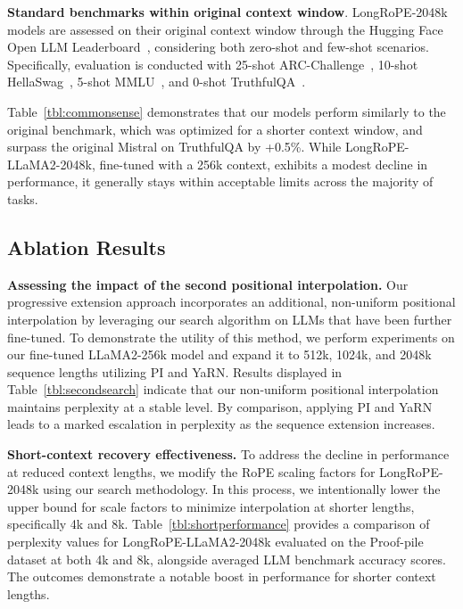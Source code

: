 \textbf{Standard benchmarks within original context window}. LongRoPE-2048k models are assessed on their original context window through the Hugging Face Open LLM Leaderboard~\cite{huggingfaceboard}, considering both zero-shot and few-shot scenarios. Specifically, evaluation is conducted with 25-shot ARC-Challenge~\cite{allenai:arc}, 10-shot HellaSwag~\cite{zellers2019hellaswag}, 5-shot MMLU~\cite{mmlu}, and 0-shot TruthfulQA~\cite{lin2021truthfulqa}.

Table~\ref{tbl:commonsense} demonstrates that our models perform similarly to the original benchmark, which was optimized for a shorter context window, and surpass the original Mistral on TruthfulQA by +0.5\%. While LongRoPE-LLaMA2-2048k, fine-tuned with a 256k context, exhibits a modest decline in performance, it generally stays within acceptable limits across the majority of tasks.

\subsection{Ablation Results}

\textbf{Assessing the impact of the second positional interpolation.} Our progressive extension approach incorporates an additional, non-uniform positional interpolation by leveraging our search algorithm on LLMs that have been further fine-tuned. To demonstrate the utility of this method, we perform experiments on our fine-tuned LLaMA2-256k model and expand it to 512k, 1024k, and 2048k sequence lengths utilizing PI and YaRN. Results displayed in Table~\ref{tbl:secondsearch} indicate that our non-uniform positional interpolation maintains perplexity at a stable level. By comparison, applying PI and YaRN leads to a marked escalation in perplexity as the sequence extension increases.

\textbf{Short-context recovery effectiveness.} To address the decline in performance at reduced context lengths, we modify the RoPE scaling factors for LongRoPE-2048k using our search methodology. In this process, we intentionally lower the upper bound for scale factors to minimize interpolation at shorter lengths, specifically 4k and 8k. Table~\ref{tbl:shortperformance} provides a comparison of perplexity values for LongRoPE-LLaMA2-2048k evaluated on the Proof-pile dataset at both 4k and 8k, alongside averaged LLM benchmark accuracy scores. The outcomes demonstrate a notable boost in performance for shorter context lengths.

